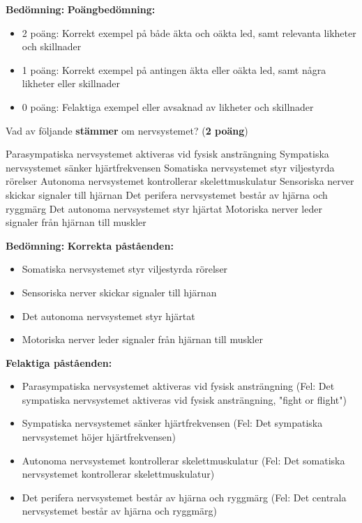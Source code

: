 \documentclass{exam}
\newenvironment{answer}
  {\begin{framed}\color{blue}\textbf{Bedömning:} }
  {\end{framed}}
\begin{document}
\begin{questions}
\begin{answer}
\textbf{Poängbedömning:}
\begin{itemize}
  \item 2 poäng: Korrekt exempel på både äkta och oäkta led, samt relevanta likheter och skillnader
  \item 1 poäng: Korrekt exempel på antingen äkta eller oäkta led, samt några likheter eller skillnader
  \item 0 poäng: Felaktiga exempel eller avsaknad av likheter och skillnader
\end{itemize}
\end{answer}
\vspace{5mm}
\question Vad av följande \textbf{stämmer} om nervsystemet? (\textbf{2 poäng})
\begin{checkboxes}
    \choice Parasympatiska nervsystemet aktiveras vid fysisk ansträngning
    \choice Sympatiska nervsystemet sänker hjärtfrekvensen
    \choice \textcolor{blue}{\checkmark} Somatiska nervsystemet styr viljestyrda rörelser
    \choice Autonoma nervsystemet kontrollerar skelettmuskulatur
    \choice \textcolor{blue}{\checkmark} Sensoriska nerver skickar signaler till hjärnan
    \choice Det perifera nervsystemet består av hjärna och ryggmärg
    \choice \textcolor{blue}{\checkmark} Det autonoma nervsystemet styr hjärtat
    \choice \textcolor{blue}{\checkmark} Motoriska nerver leder signaler från hjärnan till muskler
\end{checkboxes}

\begin{answer}
\textbf{Korrekta påståenden:}
\begin{itemize}
  \item Somatiska nervsystemet styr viljestyrda rörelser
  \item Sensoriska nerver skickar signaler till hjärnan
  \item Det autonoma nervsystemet styr hjärtat
  \item Motoriska nerver leder signaler från hjärnan till muskler
\end{itemize}

\textbf{Felaktiga påståenden:}
\begin{itemize}
  \item Parasympatiska nervsystemet aktiveras vid fysisk ansträngning (Fel: Det sympatiska nervsystemet aktiveras vid fysisk ansträngning, "fight or flight")
  \item Sympatiska nervsystemet sänker hjärtfrekvensen (Fel: Det sympatiska nervsystemet höjer hjärtfrekvensen)
  \item Autonoma nervsystemet kontrollerar skelettmuskulatur (Fel: Det somatiska nervsystemet kontrollerar skelettmuskulatur)
  \item Det perifera nervsystemet består av hjärna och ryggmärg (Fel: Det centrala nervsystemet består av hjärna och ryggmärg)
\end{itemize}


\end{answer}
\end{questions}
\end{document}
